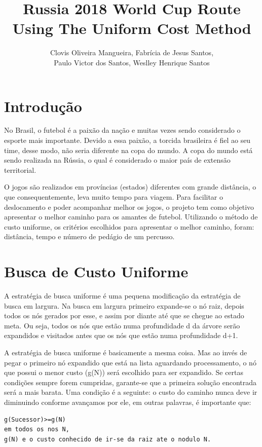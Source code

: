 \documentclass[12pt]{article}
\title{Russia 2018 World Cup Route Using The Uniform Cost Method}
\author{Clovis Oliveira Mangueira\inst{1}, Fabrícia de Jesus Santos\inst{1}, \\ Paulo Victor dos Santos\inst{1}, 	Weslley Henrique Santos\inst{1}}
\begin{document}
 

\maketitle

\section{Introdução}
No Brasil, o futebol é a paixão da nação e muitas vezes sendo considerado o esporte mais importante. Devido a essa paixão, a torcida brasileira é fiel ao seu time, desse modo, não seria diferente na copa do mundo. A copa do mundo está sendo realizada na Rússia, o qual é considerado o maior país de extensão territorial. 

O jogos são realizados em províncias (estados) diferentes com grande distância, o que consequentemente, leva muito tempo para viagem. Para facilitar o deslocamento e poder acompanhar melhor os jogos, o projeto tem como objetivo apresentar o melhor caminho para os amantes de futebol. Utilizando o método de custo uniforme, os critérios escolhidos para apresentar o melhor caminho, foram: distância, tempo e número de pedágio de um percusso.
\section{Busca de Custo Uniforme}
A estratégia de busca uniforme é uma pequena modificação da estratégia de busca em largura. Na busca em largura primeiro expande-se o nó raiz, depois todos os nós gerados por esse, e assim por diante até que se chegue ao estado meta. Ou seja, todos os nós que estão numa profundidade d da árvore serão expandidos e visitados antes que os nós que estão numa profundidade d+1.

A estratégia de busca uniforme é basicamente a mesma coisa. Mas ao invés de pegar o primeiro nó expandido que está na lista aguardando processamento, o nó que possui o menor custo (g(N)) será escolhido para ser expandido. Se certas condições sempre forem cumpridas, garante-se que a primeira solução encontrada será a mais barata. Uma condição é a seguinte: o custo do caminho nunca deve ir diminuindo conforme avançamos por ele, em outras palavras, é importante que:
\begin{lstlisting}[caption = Pseudo-código para calcular a função g(n)]
g(Sucessor)>=g(N)	
em todos os nos N, 
g(N) e o custo conhecido de ir-se da raiz ate o nodulo N.
\end{lstlisting}
\end{document}
